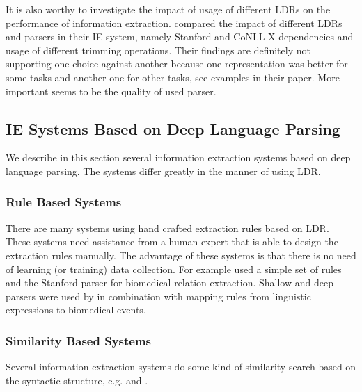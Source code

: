 It is also worthy to investigate the impact of usage of different LDRs on the performance of information extraction. \cite{Buyko:2010:EIA:1870658.1870754} compared the impact of different LDRs and parsers in their IE system, namely Stanford and CoNLL-X dependencies and usage of different trimming operations. Their findings are definitely not supporting one choice against another because one representation was better for some tasks and another one for other tasks, see examples in their paper. More important seems to be the quality of used parser.



\subsection{IE Systems Based on Deep Language Parsing} \label{sec:relwork_deep_IE_systems}


We describe in this section several information extraction systems based on deep language parsing. The systems differ greatly in the manner of using LDR.

\subsubsection{Rule Based Systems}

There are many systems using hand crafted extraction rules based on LDR. These systems need assistance from a human expert that is able to design the extraction rules manually. The advantage of these systems is that there is no need of learning (or training) data collection. For example \cite{RelEx} used a simple set of rules and the Stanford parser for biomedical relation extraction. Shallow and deep parsers were used by \cite{Yakushiji2001} in combination with mapping rules from linguistic expressions to biomedical events.

\subsubsection{Similarity Based Systems}

Several information extraction systems do some kind of similarity search based on the syntactic structure, e.g.
\citep{Etzioni08informationExtraction} and
\citep{Wang:SimilarityTreeSkeletons}.

